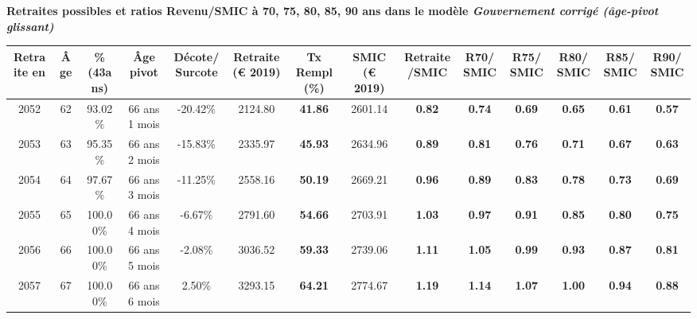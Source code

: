  \vspace{0.1cm} 
{\bf \noindent Retraites possibles et ratios Revenu/SMIC à 70, 75, 80, 85, 90 ans dans le modèle \emph{Gouvernement corrigé (âge-pivot glissant)}}  
 
\begin{adjustbox}{max width=\textwidth} 
\begin{tabular}[htb]{|c|c||c|c|c||c|c||c|c||c|c|c|c|c|} 
\hline 
 Retraite en &  Âge &  \%(43ans) &  Âge pivot &  Décote/Surcote &  Retraite (\euro{} 2019) &  Tx Rempl(\%) &  SMIC (\euro{} 2019) &  Retraite/SMIC &  R70/SMIC &  R75/SMIC &  R80/SMIC &  R85/SMIC &  R90/SMIC \\ 
\hline \hline 
 2052 &  62 &  93.02\% &  66 ans 1 mois &  -20.42\% &  2124.80 &  {\bf 41.86} &  2601.14 &  {\bf {\color{red} 0.82}} &  {\bf {\color{red} 0.74}} &  {\bf {\color{red} 0.69}} &  {\bf {\color{red} 0.65}} &  {\bf {\color{red} 0.61}} &  {\bf {\color{red} 0.57}} \\ 
\hline 
 2053 &  63 &  95.35\% &  66 ans 2 mois &  -15.83\% &  2335.97 &  {\bf 45.93} &  2634.96 &  {\bf {\color{red} 0.89}} &  {\bf {\color{red} 0.81}} &  {\bf {\color{red} 0.76}} &  {\bf {\color{red} 0.71}} &  {\bf {\color{red} 0.67}} &  {\bf {\color{red} 0.63}} \\ 
\hline 
 2054 &  64 &  97.67\% &  66 ans 3 mois &  -11.25\% &  2558.16 &  {\bf 50.19} &  2669.21 &  {\bf {\color{red} 0.96}} &  {\bf {\color{red} 0.89}} &  {\bf {\color{red} 0.83}} &  {\bf {\color{red} 0.78}} &  {\bf {\color{red} 0.73}} &  {\bf {\color{red} 0.69}} \\ 
\hline 
 2055 &  65 &  100.00\% &  66 ans 4 mois &  -6.67\% &  2791.60 &  {\bf 54.66} &  2703.91 &  {\bf 1.03} &  {\bf {\color{red} 0.97}} &  {\bf {\color{red} 0.91}} &  {\bf {\color{red} 0.85}} &  {\bf {\color{red} 0.80}} &  {\bf {\color{red} 0.75}} \\ 
\hline 
 2056 &  66 &  100.00\% &  66 ans 5 mois &  -2.08\% &  3036.52 &  {\bf 59.33} &  2739.06 &  {\bf 1.11} &  {\bf 1.05} &  {\bf {\color{red} 0.99}} &  {\bf {\color{red} 0.93}} &  {\bf {\color{red} 0.87}} &  {\bf {\color{red} 0.81}} \\ 
\hline 
 2057 &  67 &  100.00\% &  66 ans 6 mois &  2.50\% &  3293.15 &  {\bf 64.21} &  2774.67 &  {\bf 1.19} &  {\bf 1.14} &  {\bf 1.07} &  {\bf 1.00} &  {\bf {\color{red} 0.94}} &  {\bf {\color{red} 0.88}} \\ 
\hline 
\hline 
\end{tabular} 
\end{adjustbox} 
 
